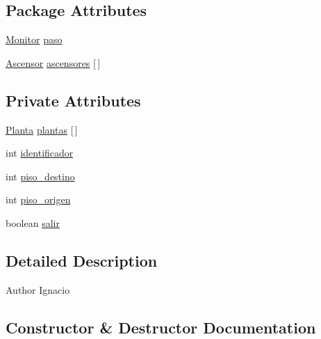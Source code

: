 \subsection*{Package Attributes}
\begin{DoxyCompactItemize}
\item 
\mbox{\hyperlink{classpecl6part2_1_1_monitor}{Monitor}} \mbox{\hyperlink{classpecl6part2_1_1_persona_aa2db1862ae911bee400535c215f5740a}{paso}}
\item 
\mbox{\hyperlink{classpecl6part2_1_1_ascensor}{Ascensor}} \mbox{\hyperlink{classpecl6part2_1_1_persona_a3e0fca0322fb911f7fb38ad78b46b70f}{ascensores}} \mbox{[}$\,$\mbox{]}
\end{DoxyCompactItemize}
\subsection*{Private Attributes}
\begin{DoxyCompactItemize}
\item 
\mbox{\hyperlink{classpecl6part2_1_1_planta}{Planta}} \mbox{\hyperlink{classpecl6part2_1_1_persona_a8c92dc1ec730569cae9d9e4f7f04f6fc}{plantas}} \mbox{[}$\,$\mbox{]}
\item 
int \mbox{\hyperlink{classpecl6part2_1_1_persona_a8b7b7d11bc23cac7514d1e3c20267589}{identificador}}
\item 
int \mbox{\hyperlink{classpecl6part2_1_1_persona_af4ceab86e7c49fa1416c701c21479a8b}{piso\+\_\+destino}}
\item 
int \mbox{\hyperlink{classpecl6part2_1_1_persona_a64acff116f7c56e347369ec54c9109ad}{piso\+\_\+origen}}
\item 
boolean \mbox{\hyperlink{classpecl6part2_1_1_persona_a929d460e971bd1271927110d189bd9b0}{salir}}
\end{DoxyCompactItemize}


\subsection{Detailed Description}
\begin{DoxyAuthor}{Author}
Ignacio 
\end{DoxyAuthor}


\subsection{Constructor \& Destructor Documentation}
\mbox{\label{classpecl6part2_1_1_persona_a604c22d8cb049c4c6dddaa9cdcb8e51f}} 

